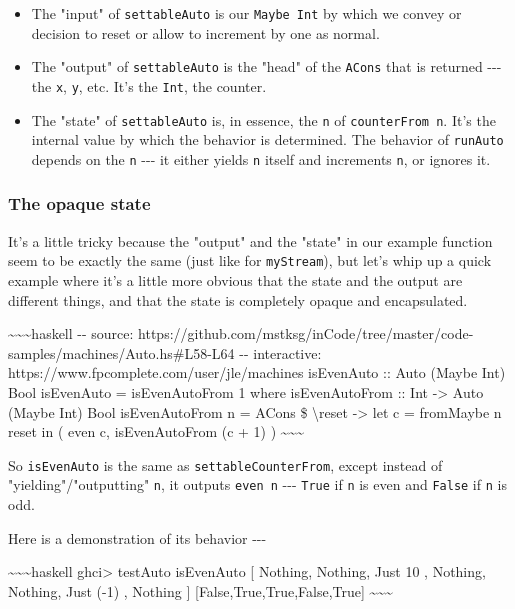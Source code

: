 \documentclass[]{article}
\begin{document}
\begin{itemize}
\tightlist
\item
  The "input" of \texttt{settableAuto} is our \texttt{Maybe\ Int} by which we
  convey or decision to reset or allow to increment by one as normal.
\item
  The "output" of \texttt{settableAuto} is the "head" of the \texttt{ACons} that
  is returned -\/-\/- the \texttt{x}, \texttt{y}, etc. It's the \texttt{Int},
  the counter.
\item
  The "state" of \texttt{settableAuto} is, in essence, the \texttt{n} of
  \texttt{counterFrom\ n}. It's the internal value by which the behavior is
  determined. The behavior of \texttt{runAuto} depends on the \texttt{n} -\/-\/-
  it either yields \texttt{n} itself and increments \texttt{n}, or ignores it.
\end{itemize}

\subsubsection{The opaque state}

It's a little tricky because the "output" and the "state" in our example
function seem to be exactly the same (just like for \texttt{myStream}), but
let's whip up a quick example where it's a little more obvious that the state
and the output are different things, and that the state is completely opaque and
encapsulated.

\textasciitilde{}\textasciitilde{}\textasciitilde{}haskell -\/- source:
https://github.com/mstksg/inCode/tree/master/code-samples/machines/Auto.hs\#L58-L64
-\/- interactive: https://www.fpcomplete.com/user/jle/machines isEvenAuto ::
Auto (Maybe Int) Bool isEvenAuto = isEvenAutoFrom 1 where isEvenAutoFrom :: Int
-\textgreater{} Auto (Maybe Int) Bool isEvenAutoFrom n = ACons \$
\textbackslash{}reset -\textgreater{} let c = fromMaybe n reset in ( even c,
isEvenAutoFrom (c + 1) ) \textasciitilde{}\textasciitilde{}\textasciitilde{}

So \texttt{isEvenAuto} is the same as \texttt{settableCounterFrom}, except
instead of "yielding"/"outputting" \texttt{n}, it outputs \texttt{even\ n}
-\/-\/- \texttt{True} if \texttt{n} is even and \texttt{False} if \texttt{n} is
odd.

Here is a demonstration of its behavior -\/-\/-

\textasciitilde{}\textasciitilde{}\textasciitilde{}haskell ghci\textgreater{}
testAuto isEvenAuto {[} Nothing, Nothing, Just 10 , Nothing, Nothing, Just (-1)
, Nothing {]} {[}False,True,True,False,True{]}
\textasciitilde{}\textasciitilde{}\textasciitilde{}
\end{document}
